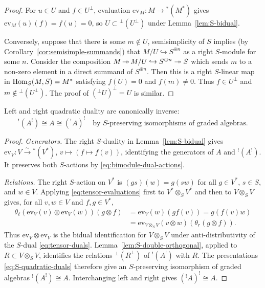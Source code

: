 \begin{advanced}
\begin{proof}
For $u\in U$ and $f\in U^\perp$, evaluation $\mathrm{ev}_M:M\to{}^*(M^*)$ gives $\mathrm{ev}_M(u)(f)=f(u)=0$, so $U\subset{}^\perp(U^\perp)$ under Lemma~\ref{lem:S-bidual}.

Conversely, suppose that there is some $m\notin U$, semisimplicity of $S$ implies (by Corollary~\ref{cor:semisimple-summands}) that $M/U\hookrightarrow S^{\oplus n}$ as a right $S$-module for some $n$.
Consider the composition $M\operatorname{\twoheadrightarrow} M/U\hookrightarrow S^{\oplus n}\twoheadrightarrow S$ which sends $m$ to a non-zero element in a direct summand of $S^{\oplus n}$.
Then this is a right $S$-linear map in $\operatorname{Hom}\nolimits_S(M,S)=M^*$ satisfying $f(U)=0$ and $f(m)\neq0$.
Thus $f\in U^\perp$ and $m\notin{}^\perp(U^\perp)$.
The proof of $({}^\perp U)^\perp=U$ is similar.
\end{proof}

\begin{theorem}\label{thm:quadratic-bidual}
Left and right quadratic duality are canonically inverse:
\[
{}^!(A^!)\cong A\cong({}^!A)^!
\quad\text{by }S\text{-preserving isomorphisms of graded algebras}.
\]
\end{theorem}

\begin{proof}
\emph{Generators.} The right $S$-duality in Lemma~\ref{lem:S-bidual} gives
$\mathrm{ev}_V:V\xrightarrow{\sim}{}^*(V^*)$, $v\mapsto(f\mapsto f(v))$, identifying the generators of $A$ and $ {}^!(A^!)$.
It preserves both $S$-actions by \eqref{eq:bimodule-dual-actions}.

\emph{Relations.} The right $S$-action on $V^*$ is $(gs)(w)=g(sw)$ for all $g\in V^*$, $s\in S$, and $w\in V$.
Applying \eqref{eq:tensor-evaluations} first to $V^*\otimes_S V^*$ and then to $V\otimes_S V$ gives, for all $v,w\in V$ and $f,g\in V^*$,
\begin{equation}\label{eq:S-bidual-tensor-square}
\begin{aligned}
\theta_\ell(\mathrm{ev}_V(v)\otimes\mathrm{ev}_V(w))(g\otimes f)
&=\mathrm{ev}_V(w)(g f(v))=g(f(v)w)\\
&=\mathrm{ev}_{V\otimes_S V}(v\otimes w)(\theta_r(g\otimes f)).
\end{aligned}
\end{equation}
Thus $\mathrm{ev}_V\otimes\mathrm{ev}_V$ is the bidual identification for $V\otimes_S V$ under anti-distributivity of the $S$-dual \eqref{eq:tensor-duals}.
Lemma~\ref{lem:S-double-orthogonal}, applied to $R\subset V\otimes_S V$, identifies the relations $ {}^\perp(R^\perp)$ of $ {}^!(A^!)$ with $R$.
The presentations \eqref{eq:S-quadratic-duals} therefore give an $S$-preserving isomorphism of graded algebras $ {}^!(A^!)\cong A$.
Interchanging left and right gives $({}^!A)^!\cong A$.
\end{proof}


\end{advanced}
